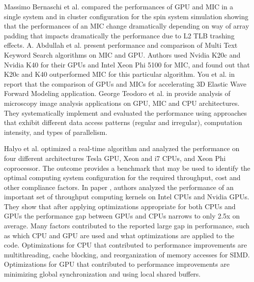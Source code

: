 
Massimo Bernaschi et al. \cite{R:10} compared the performances of 
GPU and MIC in a single system and in cluster configuration for the spin system simulation 
showing that the performances of an MIC change dramatically depending on way of array padding that impacts dramatically the performance
 due to L2 TLB trashing effects.  
A. Abdullah et al. \cite{R:12} present performance and comparison of Multi Text Keyword Search algorithms on MIC and GPU. 
Authors used Nvidia K20c and Nvidia K40 for their GPUs and Intel Xeon Phi 5100 for MIC, and found out that K20c and K40 outperformed MIC for this particular algorithm. 
You et al. in \cite{R:8} report that the comparison of GPUs and MICs for accelerating 3D Elastic Wave Forward
Modeling application. 
George Teodoro et al. in \cite{R:9} provide analysis of microscopy image analysis applications on GPU, MIC and CPU architectures. 
They systematically implement and evaluated the performance using approaches that exhibit different data access patterns (regular and irregular), computation intensity, and types of parallelism. %



Halyo et al. \cite{halyo2014first} optimized a real-time algorithm and analyzed the performance on four different architectures Tesla GPU, Xeon and i7 CPUs, and Xeon Phi coprocessor. The outcome provides a benchmark that may be used to identify the optimal computing system configuration for the required throughput, cost and other compliance factors.
In paper \cite{lee2010debunking}, authors analyzed the performance of an important set of throughput computing kernels on Intel CPUs and Nvidia GPUs. They show that after applying optimizations appropriate for both CPUs and GPUs the performance gap between GPUs and CPUs narrows to only 2.5x on average. Many factors contributed to the reported large gap in performance, such as which CPU and GPU are used and what optimizations are applied to the code. Optimizations for CPU that contributed to performance improvements are multithreading, cache blocking, and reorganization of memory accesses for SIMD. Optimizations for GPU that contributed to performance improvements are minimizing global synchronization and using local shared buffers.




